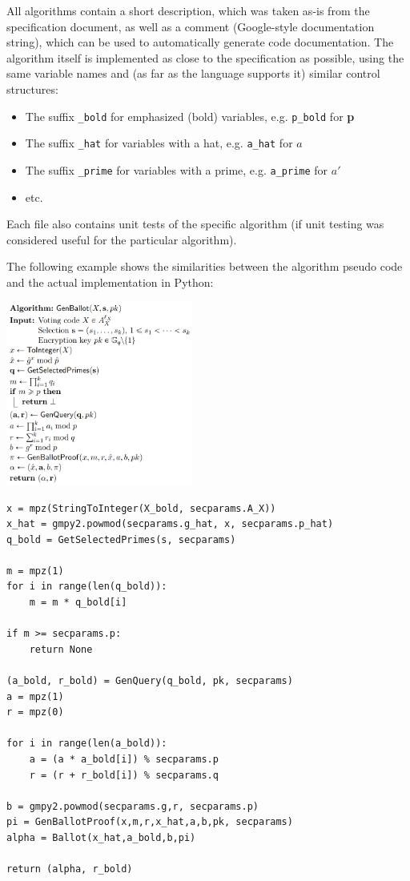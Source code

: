 All algorithms contain a short description, which was taken as-is from the specification document, as well as a comment (Google-style documentation string), which can be used to automatically generate code documentation. The algorithm itself is implemented as close to the specification as possible, using the same variable names and (as far as the language supports it) similar control structures:

\begin{itemize}
	\item The suffix \texttt{\_bold} for emphasized (bold) variables, e.g. \texttt{p\_bold} for \textbf{p}
	\item The suffix \texttt{\_hat} for variables with a hat, e.g. \texttt{a\_hat} for $\hat{a}$
	\item The suffix \texttt{\_prime} for variables with a prime, e.g. \texttt{a\_prime} for $a'$
	\item etc.
\end{itemize}

Each file also contains unit tests of the specific algorithm (if unit testing was considered useful for the particular algorithm).

The following example shows the similarities between the algorithm pseudo code and the actual implementation in Python:

\begin{multicols}{2}
\includegraphics[width=0.46\textwidth]{assets/genballot.png}
\columnbreak
\begin{verbatim}
x = mpz(StringToInteger(X_bold, secparams.A_X))
x_hat = gmpy2.powmod(secparams.g_hat, x, secparams.p_hat)
q_bold = GetSelectedPrimes(s, secparams)

m = mpz(1)
for i in range(len(q_bold)):
    m = m * q_bold[i]

if m >= secparams.p:
    return None

(a_bold, r_bold) = GenQuery(q_bold, pk, secparams)
a = mpz(1)
r = mpz(0)

for i in range(len(a_bold)):
    a = (a * a_bold[i]) % secparams.p
    r = (r + r_bold[i]) % secparams.q

b = gmpy2.powmod(secparams.g,r, secparams.p)
pi = GenBallotProof(x,m,r,x_hat,a,b,pk, secparams)
alpha = Ballot(x_hat,a_bold,b,pi)

return (alpha, r_bold)
\end{verbatim}
\end{multicols}

